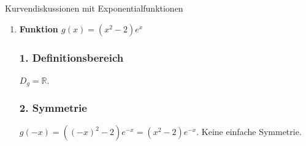 \begin{loesungsumgebung}{Kurvendiskussionen mit Exponentialfunktionen}
\begin{enumerate}[label=(\alph*)]
    \subsubsection*{9. Wendepunkte}
    Notwendige Bedingung: $f''(x)=0$.
    $e^{-x}(x-2) = 0$. Da $e^{-x} \neq 0$, muss $x-2=0 \Rightarrow x=2$.
    Potenzielle Wendestelle $x_W=2$. $f(2) = 2e^{-2} = \frac{2}{e^2}$.
    Hinreichende Bedingung (mit $f'''(x)$):
    $f'''(x) = \frac{d}{dx}(e^{-x}(x-2)) = (-e^{-x})(x-2) + e^{-x}(1) = e^{-x}(-x+2+1) = e^{-x}(3-x)$.
    $f'''(2) = e^{-2}(3-2) = e^{-2} \neq 0$.
    Also liegt ein Wendepunkt bei $W(2 | \frac{2}{e^2} \approx 0.271)$ vor.

    \subsubsection*{10. Krümmungsverhalten}
    Das Vorzeichen von $f''(x) = e^{-x}(x-2)$ hängt von $(x-2)$ ab.
    \begin{itemize}
        \item Für $x < 2$: $x-2 < 0 \Rightarrow f''(x) < 0 \Rightarrow f(x)$ ist rechtsgekrümmt (konkav).
        \item Für $x > 2$: $x-2 > 0 \Rightarrow f''(x) > 0 \Rightarrow f(x)$ ist linksgekrümmt (konvex).
    \end{itemize}

    \subsubsection*{11. Wertebereich}
    $W_f = (-\infty, \frac{1}{e}]$.

    \item \textbf{Funktion $g(x) = (x^2-2)e^x$}

    \subsubsection*{1. Definitionsbereich}
    $D_g = \mathbb{R}$.

    \subsubsection*{2. Symmetrie}
    $g(-x) = ((-x)^2-2)e^{-x} = (x^2-2)e^{-x}$. Keine einfache Symmetrie.


\end{enumerate}
\end{loesungsumgebung}

